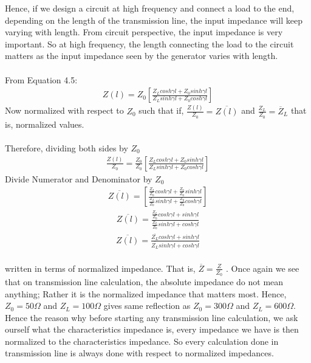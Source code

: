 Hence, if we design a circuit at high frequency and connect a load to the end, depending on the length of the transmission line, the input impedance will keep varying with length. From circuit perspective, the input impedance is very important. So at high frequency, the length connecting the load to the circuit matters as the input impedance seen by the generator varies with length.\\\\
From Equation 4.5:
\begin{align*}
Z(l) = Z_0[\frac{Z_Lcosh\gamma l + Z_0sinh\gamma l}{Z_Lsinh\gamma l + Z_0cosh\gamma l}]
\end{align*}
Now normalized with respect to $Z_0$ such that if,
$\frac{Z(l)}{Z_0} = \overline{Z(l)}$ and $\frac{Z_L}{Z_0} = \overline{Z}_L$ that is, normalized values.\\\\
Therefore, dividing both sides by $Z_0$
\begin{align*}
\frac{Z(l)}{Z_0} = \frac{Z_0}{Z_0}[\frac{Z_Lcosh\gamma l + Z_0sinh\gamma l}{Z_Lsinh\gamma l + Z_0cosh\gamma l}] 
\end{align*}
Divide Numerator and Denominator by $Z_0$
\begin{align*}
\overline{Z(l)} = [ \frac{\frac{Z_L}{Z_0}cosh\gamma l + \frac{Z_0}{Z_0}sinh\gamma l}{\frac{Z_L}{Z_0}sinh\gamma l + \frac{Z_0}{Z_0}cosh\gamma l}]
\end{align*}
\begin{align*}
\overline{Z(l)} = \frac{\frac{Z_L}{Z_0}cosh\gamma l + sinh\gamma l}{\frac{Z_L}{Z_0}sinh\gamma l + cosh\gamma l}
\end{align*}
\begin{align}
\overline{Z(l)} = \frac{\overline{Z_L}cosh\gamma l + sinh\gamma l}{\overline{Z_L}sinh\gamma l + cosh\gamma l}
\end{align} \\written in terms of normalized impedance. That is, $\overline{Z} = \frac{Z}{Z_0}$ .
Once again we see that on transmission line calculation, the absolute impedance do not mean anything; Rather it is the normalized impedance that matters most. Hence, $Z_0 = 50\Omega$ and $Z_L = 100\Omega$ gives same reflection as $Z_0 = 300\Omega$ and $Z_L =600\Omega$. Hence the reason why before starting any transmission line calculation, we ask ourself what the characteristics impedance is, every impedance we have is then normalized to the characteristics impedance. So every calculation done in transmission line is always done with respect to normalized impedances.\\
